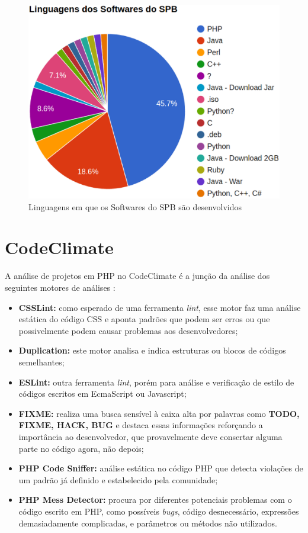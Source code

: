 \begin{figure}[!htb]
	\centering
    \includegraphics[keepaspectratio=true,scale=0.5]
    {figuras/linguagens_softwares_spb.eps}
  \caption{Linguagens em que os Softwares do SPB são desenvolvidos}
  \label{fig:linguagens_softwares_spb}
\end{figure}

\newpage

\section{CodeClimate}

A análise de projetos em PHP no CodeClimate é a junção da análise dos seguintes
motores de análises \cite{enginesCodeClimate}:

\begin{itemize}
  \item \textbf{CSSLint:} como esperado de uma ferramenta \textit{lint}, esse
	motor faz uma análise estática do código CSS e aponta padrões que podem ser
	erros ou que possivelmente podem causar problemas aos desenvolvedores;
	\item \textbf{Duplication:} este motor analisa e indica estruturas ou blocos
	de códigos semelhantes;
	\item \textbf{ESLint:} outra ferramenta \textit{lint}, porém para análise e
	verificação de estilo de códigos escritos em EcmaScript ou Javascript;
	\item \textbf{FIXME:} realiza uma busca sensível à caixa alta por palavras
	como \textbf{TODO, FIXME, HACK, BUG} e destaca essas informações reforçando a
	importância ao desenvolvedor, que provavelmente deve consertar alguma parte no
	código agora, não depois;
	\item \textbf{PHP Code Sniffer:} análise estática no código PHP que detecta
	violações de um padrão já definido e estabelecido pela comunidade;
	\item \textbf{PHP Mess Detector:} procura por diferentes potenciais problemas
	com o código escrito em PHP, como possíveis \textit{bugs}, código desnecessário,
	expressões demasiadamente complicadas, e parâmetros ou métodos não utilizados.
\end{itemize}

